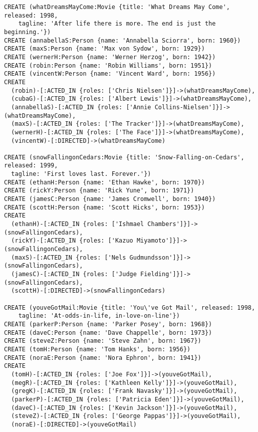 \begin{lstlisting}
CREATE (whatDreamsMayCome:Movie {title: 'What Dreams May Come', released: 1998,
    tagline: 'After life there is more. The end is just the beginning.'})
CREATE (annabellaS:Person {name: 'Annabella Sciorra', born: 1960})
CREATE (maxS:Person {name: 'Max von Sydow', born: 1929})
CREATE (wernerH:Person {name: 'Werner Herzog', born: 1942})
CREATE (robin:Person {name: 'Robin Williams', born: 1951})
CREATE (vincentW:Person {name: 'Vincent Ward', born: 1956})
CREATE
  (robin)-[:ACTED_IN {roles: ['Chris Nielsen']}]->(whatDreamsMayCome),
  (cubaG)-[:ACTED_IN {roles: ['Albert Lewis']}]->(whatDreamsMayCome),
  (annabellaS)-[:ACTED_IN {roles: ['Annie Collins-Nielsen']}]->(whatDreamsMayCome),
  (maxS)-[:ACTED_IN {roles: ['The Tracker']}]->(whatDreamsMayCome),
  (wernerH)-[:ACTED_IN {roles: ['The Face']}]->(whatDreamsMayCome),
  (vincentW)-[:DIRECTED]->(whatDreamsMayCome)

CREATE (snowFallingonCedars:Movie {title: 'Snow-Falling-on-Cedars', released: 1999,
  tagline: 'First loves last. Forever.'})
CREATE (ethanH:Person {name: 'Ethan Hawke', born: 1970})
CREATE (rickY:Person {name: 'Rick Yune', born: 1971})
CREATE (jamesC:Person {name: 'James Cromwell', born: 1940})
CREATE (scottH:Person {name: 'Scott Hicks', born: 1953})
CREATE
  (ethanH)-[:ACTED_IN {roles: ['Ishmael Chambers']}]->(snowFallingonCedars),
  (rickY)-[:ACTED_IN {roles: ['Kazuo Miyamoto']}]->(snowFallingonCedars),
  (maxS)-[:ACTED_IN {roles: ['Nels Gudmundsson']}]->(snowFallingonCedars),
  (jamesC)-[:ACTED_IN {roles: ['Judge Fielding']}]->(snowFallingonCedars),
  (scottH)-[:DIRECTED]->(snowFallingonCedars)

CREATE (youveGotMail:Movie {title: 'You\'ve Got Mail', released: 1998,
    tagline: 'At-odds-in-life, in-love-on-line'})
CREATE (parkerP:Person {name: 'Parker Posey', born: 1968})
CREATE (daveC:Person {name: 'Dave Chappelle', born: 1973})
CREATE (steveZ:Person {name: 'Steve Zahn', born: 1967})
CREATE (tomH:Person {name: 'Tom Hanks', born: 1956})
CREATE (noraE:Person {name: 'Nora Ephron', born: 1941})
CREATE
  (tomH)-[:ACTED_IN {roles: ['Joe Fox']}]->(youveGotMail),
  (megR)-[:ACTED_IN {roles: ['Kathleen Kelly']}]->(youveGotMail),
  (gregK)-[:ACTED_IN {roles: ['Frank Navasky']}]->(youveGotMail),
  (parkerP)-[:ACTED_IN {roles: ['Patricia Eden']}]->(youveGotMail),
  (daveC)-[:ACTED_IN {roles: ['Kevin Jackson']}]->(youveGotMail),
  (steveZ)-[:ACTED_IN {roles: ['George Pappas']}]->(youveGotMail),
  (noraE)-[:DIRECTED]->(youveGotMail)


\end{lstlisting}
